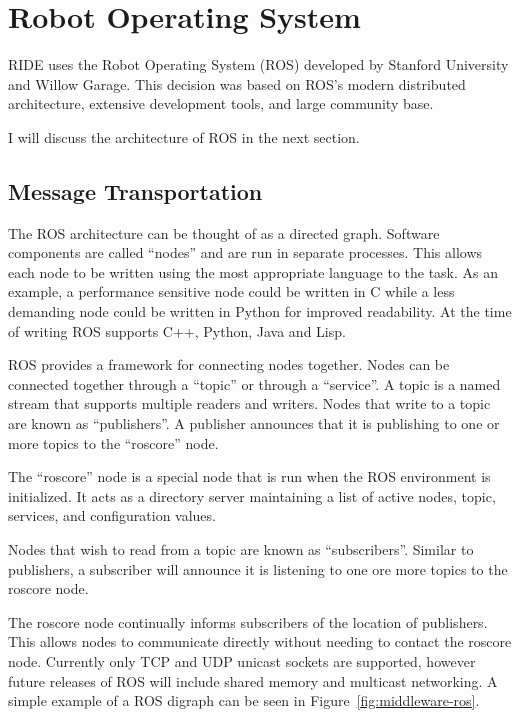 \section{Robot Operating System}
RIDE uses the Robot Operating System (ROS) developed by Stanford University and Willow Garage. This decision was based on ROS's modern distributed architecture, extensive development tools, and large community base.

I will discuss the architecture of ROS in the next section.


\subsection{Message Transportation}
The ROS architecture can be thought of as a directed graph. Software components are called ``nodes'' and are run in separate processes. This allows each node to be written using the most appropriate language to the task. As an example, a performance sensitive node could be written in C while a less demanding node could be written in Python for improved readability. At the time of writing ROS supports C++, Python, Java and Lisp.

ROS provides a framework for connecting nodes together. Nodes can be connected together through a ``topic'' or through a ``service''. A topic is a named stream that supports multiple readers and writers. Nodes that write to a topic are known as ``publishers''. A publisher announces that it is publishing to one or more topics to the ``roscore'' node. 

The ``roscore'' node is a special node that is run when the ROS environment is initialized. It acts as a directory server maintaining a list of active nodes, topic, services, and configuration values.

Nodes that wish to read from a topic are known as ``subscribers''. Similar to publishers, a subscriber will announce it is listening to one ore more topics to the roscore node.

The roscore node continually informs subscribers of the location of publishers. This allows nodes to communicate directly without needing to contact the roscore node. Currently only TCP and UDP unicast sockets are supported, however future releases of ROS will include shared memory and multicast networking. A simple example of a ROS digraph can be seen in Figure~\ref{fig:middleware-ros}.


